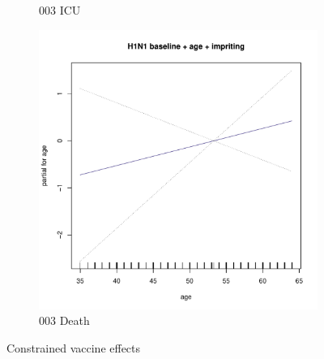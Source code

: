 \documentclass[12pt,twoside]{article}
\begin{document}
\begin{figure}[h]
\begin{subfigure}{.3\linewidth}
                \caption{003 ICU}
        \end{subfigure}
        \begin{subfigure}{.3\linewidth}
                \includegraphics[width=\textwidth, page=8]{003Death_constrained}
                \caption{003 Death}
        \end{subfigure}
        \caption{Constrained vaccine effects}
        \end{figure}
        
      

    
  
\end{document}
